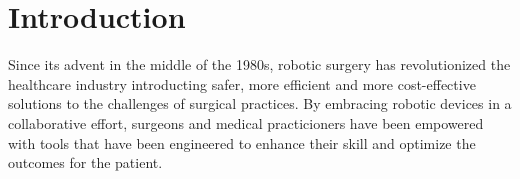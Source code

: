 \documentclass[../main.tex]{subfiles}
\begin{document}
\section{Introduction}
Since its advent in the middle of the 1980s, robotic surgery has revolutionized the healthcare industry introducting safer, more efficient and more cost-effective solutions to the challenges of surgical practices. By embracing robotic devices in a collaborative effort, surgeons and medical practicioners have been empowered with tools that have been engineered to enhance their skill and optimize the outcomes for the patient.    
\end{document}
